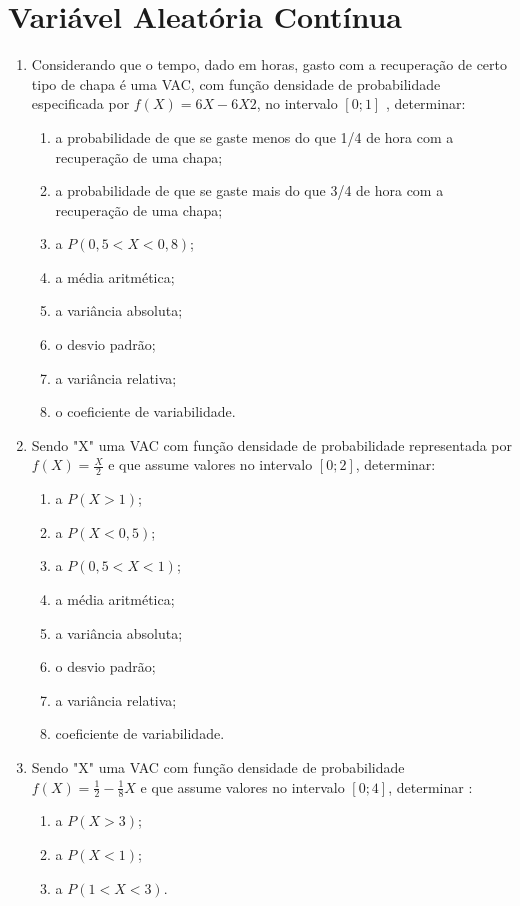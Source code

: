 \chapter{Variável Aleatória Contínua}

\begin{enumerate}[resume]

\item Considerando que o tempo, dado em horas, gasto com a recuperação de certo tipo de chapa é uma VAC, com função densidade de probabilidade especificada por $ f(X)= 6X - 6X2$, no intervalo $[0 ; 1]$ , determinar: 
	\begin{enumerate}
	\item a probabilidade de que se gaste menos do que 1/4 de hora com a recuperação de uma chapa;
	\item a probabilidade de que se gaste mais do que 3/4 de hora com a recuperação de uma chapa;
	\item a $P(0,5 < X < 0,8)$;
	\item a média aritmética;
	\item  a variância absoluta;
	\item o desvio padrão;
	\item a variância relativa;
	\item o coeficiente de variabilidade.
	\end{enumerate}
	
\item Sendo "X" uma VAC com função densidade de probabilidade representada por $f(X) = \frac{X}{2}$ e que assume valores no intervalo $[0 ; 2]$, determinar:
	\begin{enumerate}
	\item a $P(X > 1)$; 
	\item a $P(X < 0,5)$;
	\item a $P(0,5 < X < 1)$;
	\item a média aritmética;
	\item a variância absoluta;
	\item o desvio padrão;
	\item a variância relativa;
	\item coeficiente de variabilidade.
	\end{enumerate}

\item Sendo "X" uma VAC com função densidade de probabilidade $f(X) = \frac{1}{2} - \frac{1}{8}X$ e que assume valores no intervalo $[0 ; 4]$, determinar	:
	\begin{enumerate}
	\item a $P(X > 3)$;
	\item a $P(X < 1)$;
	\item a $P(1 < X < 3)$.
	\end{enumerate}


\end{enumerate}
